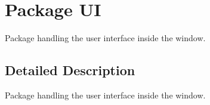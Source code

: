 \hypertarget{namespace_u_i}{\section{Package U\-I}
\label{namespace_u_i}
}


Package handling the user interface inside the window.  




\subsection{Detailed Description}
Package handling the user interface inside the window. 